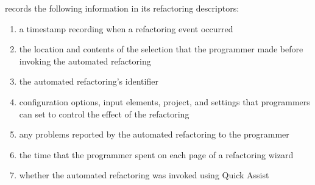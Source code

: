 \CodingSpectator{} records the following information in its refactoring
descriptors:

\begin{enumerate}

\item a timestamp recording when a refactoring event occurred

\item the location and contents of the selection that the programmer made before
  invoking the automated refactoring

\item the automated refactoring's identifier

\item configuration options, \eg{} input elements, project, and settings that
  programmers can set to control the effect of the refactoring

\item any problems reported by the automated refactoring to the programmer

\item the time that the programmer spent on each page of a refactoring wizard

\item whether the automated refactoring was invoked using Quick Assist

\end{enumerate}

%

